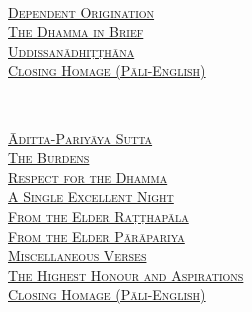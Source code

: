 {  \clearpage
  \vspace{1.5cm}

  {\libertinusFont\selectfont\textbf{\textsc{\fontsize{18}{12}\selectfont{}}}}\\

  \textsc{\fontsize{14.4}{28}\selectfont
    \hyperref[dependent-origination]{Dependent Origination} \ifdesktopversion\else\pageref{dependent-origination}\fi\\
    \hyperref[dhamma-in-brief]{The Dhamma in Brief} \ifdesktopversion\else\pageref{dhamma-in-brief}\fi\\
    \hyperref[uddissanadhitthana]{Uddissanādhiṭṭhāna} \ifdesktopversion\else\pageref{uddissanadhitthana}\fi\\
    \hyperref[closing-homage]{Closing Homage (Pāli-English)} \ifdesktopversion\else\pageref{closing-homage}\fi\\
  }

  \vspace{1.5cm}

  {\libertinusFont\selectfont\textbf{\textsc{\fontsize{18}{12}\selectfont{}}}}\\

  \textsc{\fontsize{14.4}{28}\selectfont
    \hyperref[aditta-pariyaya]{Āditta-Pariyāya Sutta} \ifdesktopversion\else\pageref{aditta-pariyaya}\fi\\
    \hyperref[burdens]{The Burdens} \ifdesktopversion\else\pageref{burdens}\fi\\
    \hyperref[respect-for-the-dhamma]{Respect for the Dhamma} \ifdesktopversion\else\pageref{respect-for-the-dhamma}\fi\\
    \hyperref[single-excellent-night]{A Single Excellent Night} \ifdesktopversion\else\pageref{single-excellent-night}\fi\\
    \hyperref[ratthapala]{From the Elder Raṭṭhapāla}  \ifdesktopversion\else\pageref{ratthapala}\fi\\
    \hyperref[parapariya]{From the Elder Pārāpariya} \ifdesktopversion\else\pageref{parapariya}\fi\\
    \hyperref[misc-verses]{Miscellaneous Verses} \ifdesktopversion\else\pageref{misc-verses}\fi\\
    \hyperref[highest-honour-aspirations]{The Highest Honour and Aspirations} \ifdesktopversion\else\pageref{highest-honour-aspirations}\fi\\
    \hyperref[closing-homage]{Closing Homage (Pāli-English)} \ifdesktopversion\else\pageref{closing-homage}\fi\\
  }

}
